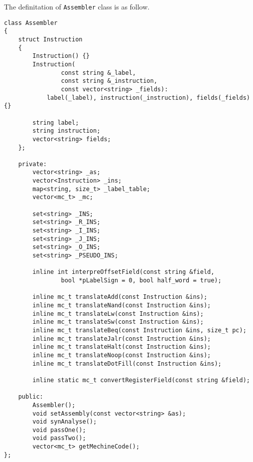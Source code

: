 \documentclass[a4paper]{article}
\begin{document}
The definitation of \verb|Assembler| class is as follow.
\begin{verbatim}
class Assembler
{
    struct Instruction
    {
        Instruction() {}
        Instruction(
                const string &_label,
                const string &_instruction,
                const vector<string> _fields):
            label(_label), instruction(_instruction), fields(_fields) {}

        string label;
        string instruction;
        vector<string> fields;
    };

    private:
        vector<string> _as;
        vector<Instruction> _ins;
        map<string, size_t> _label_table;
        vector<mc_t> _mc;

        set<string> _INS;
        set<string> _R_INS;
        set<string> _I_INS;
        set<string> _J_INS;
        set<string> _O_INS;
        set<string> _PSEUDO_INS;

        inline int interpreOffsetField(const string &field,
                bool *pLabelSign = 0, bool half_word = true);

        inline mc_t translateAdd(const Instruction &ins);
        inline mc_t translateNand(const Instruction &ins);
        inline mc_t translateLw(const Instruction &ins);
        inline mc_t translateSw(const Instruction &ins);
        inline mc_t translateBeq(const Instruction &ins, size_t pc);
        inline mc_t translateJalr(const Instruction &ins);
        inline mc_t translateHalt(const Instruction &ins);
        inline mc_t translateNoop(const Instruction &ins);
        inline mc_t translateDotFill(const Instruction &ins);

        inline static mc_t convertRegisterField(const string &field);

    public:
        Assembler();
        void setAssembly(const vector<string> &as);
        void synAnalyse();
        void passOne();
        void passTwo();
        vector<mc_t> getMechineCode();
};
\end{verbatim}
\end{document}
